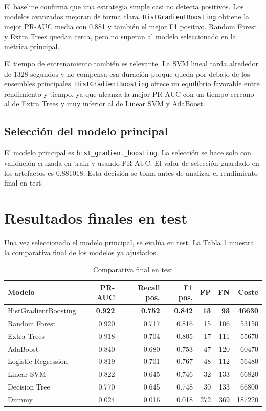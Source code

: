 \documentclass[11pt,a4paper]{article}
\begin{document}
El baseline confirma que una estrategia simple casi no detecta positivos. Los modelos avanzados mejoran de forma clara. \texttt{HistGradientBoosting} obtiene la mejor PR-AUC media con 0.881 y también el mejor F1 positivo. Random Forest y Extra Trees quedan cerca, pero no superan al modelo seleccionado en la métrica principal.

El tiempo de entrenamiento también es relevante. La SVM lineal tarda alrededor de 1328 segundos y no compensa esa duración porque queda por debajo de los ensembles principales. \texttt{HistGradientBoosting} ofrece un equilibrio favorable entre rendimiento y tiempo, ya que alcanza la mejor PR-AUC con un tiempo cercano al de Extra Trees y muy inferior al de Linear SVM y AdaBoost.

\subsection{Selección del modelo principal}

El modelo principal es \texttt{hist\_gradient\_boosting}. La selección se hace solo con validación cruzada en train y usando PR-AUC. El valor de selección guardado en los artefactos es 0.881018. Esta decisión se toma antes de analizar el rendimiento final en test.

\section{Resultados finales en test}
\label{sec_test}

Una vez seleccionado el modelo principal, se evalúa en test. La Tabla \ref{tab_test} muestra la comparativa final de los modelos ya ajustados.

\begin{table}[H]
\centering
\caption{Comparativa final en test}
\label{tab_test}
\small
\begin{tabular}{@{}lrrrrrr@{}}
\toprule
\textbf{Modelo} & \textbf{PR-AUC} & \textbf{Recall pos.} & \textbf{F1 pos.} & \textbf{FP} & \textbf{FN} & \textbf{Coste}\\
\midrule
\rowcolor{bestrow} HistGradientBoosting & \textbf{0.922} & \textbf{0.752} & \textbf{0.842} & \textbf{13} & \textbf{93} & \textbf{46630}\\
Random Forest & 0.920 & 0.717 & 0.816 & 15 & 106 & 53150\\
Extra Trees & 0.918 & 0.704 & 0.805 & 17 & 111 & 55670\\
AdaBoost & 0.840 & 0.680 & 0.753 & 47 & 120 & 60470\\
Logistic Regression & 0.819 & 0.701 & 0.767 & 48 & 112 & 56480\\
Linear SVM & 0.822 & 0.645 & 0.746 & 32 & 133 & 66820\\
Decision Tree & 0.770 & 0.645 & 0.748 & 30 & 133 & 66800\\
Dummy & 0.024 & 0.016 & 0.018 & 272 & 369 & 187220\\
\bottomrule
\end{tabular}
\end{table}
\end{document}
